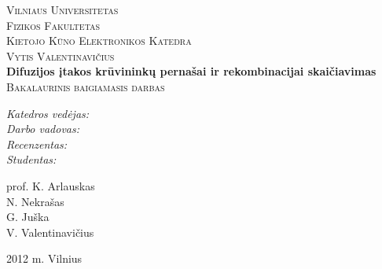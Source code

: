 \begin{titlepage}

\begin{center}



\textsc{\LARGE Vilniaus Universitetas} \\
\textsc{\LARGE Fizikos Fakultetas} \\
\textsc{\LARGE Kietojo Kūno Elektronikos Katedra}\\[2cm]

\textsc{\Large Vytis Valentinavičius}\\[1.5cm]




{ \huge \bfseries Difuzijos įtakos krūvininkų pernašai ir rekombinacijai skaičiavimas}\\[1cm]

\textsc{\Large Bakalaurinis baigiamasis darbas}\\[2cm]

\begin{minipage}{0.4\textwidth}
\begin{flushleft} \large
\emph{Katedros vedėjas:} \\
\emph{Darbo vadovas:} \\
\emph{Recenzentas:} \\
\emph{Studentas:} \\
\end{flushleft}
\end{minipage}
\begin{minipage}{0.4\textwidth}
\begin{flushright} \large
prof. K. Arlauskas \\
N. Nekrašas \\
G. Juška\\
V. Valentinavičius \\
\end{flushright}
\end{minipage}



\vfill

{\large 2012 m. Vilnius}

\end{center}

\end{titlepage}